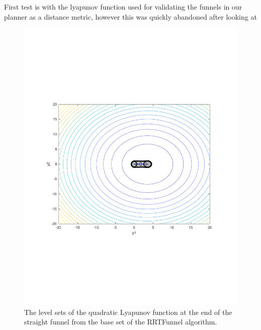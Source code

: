 First test is with the lyapunov function used for validating the funnels in our
planner as a distance metric, however this was quickly abandoned after looking
at
\begin{figure}
  \includegraphics[scale=.5]{figures/rrtfunnel/straight-funnel-lyapunov-level-sets}
  \caption{The level sets of the quadratic Lyapunov function at the end of the
    straight funnel from the base set of the RRTFunnel algorithm.}
\end{figure}

